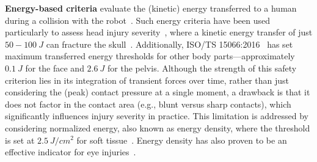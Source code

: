 \textbf{Energy-based criteria} evaluate the (kinetic) energy transferred to a human during a collision with the robot~\citep{haddadin2011safe, haddadin2013towards, iso2016collaborative}. Such energy criteria have been used particularly to assess head injury severity~\citep{haddadin2009requirements}, where a kinetic energy transfer of just $50-100~\si{J}$ can fracture the skull~\citep{haddadin2009requirements}. Additionally, ISO/TS 15066:2016~\citep{iso2016collaborative} has set maximum transferred energy thresholds for other body parts—approximately $\SI{0.1}{J}$ for the face and $\SI{2.6}{J}$ for the pelvis. Although the strength of this safety criterion lies in its integration of transient forces over time, rather than just considering the (peak) contact pressure at a single moment, a drawback is that it does not factor in the contact area (e.g., blunt versus sharp contacts), which significantly influences injury severity in practice. This limitation is addressed by considering normalized energy, also known as energy density, where the threshold is set at $\SI{2.5}{J \per cm^2}$ for soft tissue~\citep{haddadin2011safe}. Energy density has also proven to be an effective indicator for eye injuries~\citep{haddadin2013towards}.

